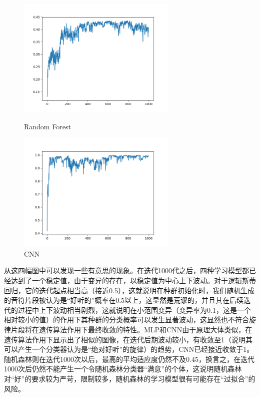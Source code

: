\documentclass[UTF8,a4paper,10pt]{ctexart}
\begin{document}
\begin{figure}[H]
\begin{minipage}[t]{0.5\linewidth}
\centering
\includegraphics[width=3in]{output_forest.png}
\caption{Random Forest}
\label{fig:side:a}
\end{minipage}%
\begin{minipage}[t]{0.5\linewidth}
\centering
\includegraphics[width=3in]{output_cnn.png}
\caption{CNN}
\label{fig:side:b}
\end{minipage}
\end{figure}

从这四幅图中可以发现一些有意思的现象。在迭代1000代之后，四种学习模型都已经达到了一个稳定值，由于变异的存在，以稳定值为中心上下波动。对于逻辑斯蒂回归，它的迭代起点相当高（接近0.5），这就说明在种群初始化时，我们随机生成的音符片段被认为是“好听的”概率在0.5以上，这显然是荒谬的，并且其在后续迭代的过程中上下波动相当剧烈，这就说明在小范围变异（变异率为0.1，这是一个相对较小的值）的作用下其种群的分类概率可以发生显著波动，这显然也不符合旋律片段将在遗传算法作用下最终收敛的特性。MLP和CNN由于原理大体类似，在遗传算法作用下显示出了相似的图像，在迭代后期波动较小，有收敛至1（说明其可以产生一个分类器认为是“绝对好听”的旋律）的趋势，CNN已经接近收敛于1。随机森林则在迭代1000次以后，最高的平均适应度仍然不及0.45，换言之，在迭代1000次后仍然不能产生一个令随机森林分类器“满意”的个体，这说明随机森林对“好”的要求较为严苛，限制较多，随机森林的学习模型很有可能存在“过拟合”的风险。
\end{document}
